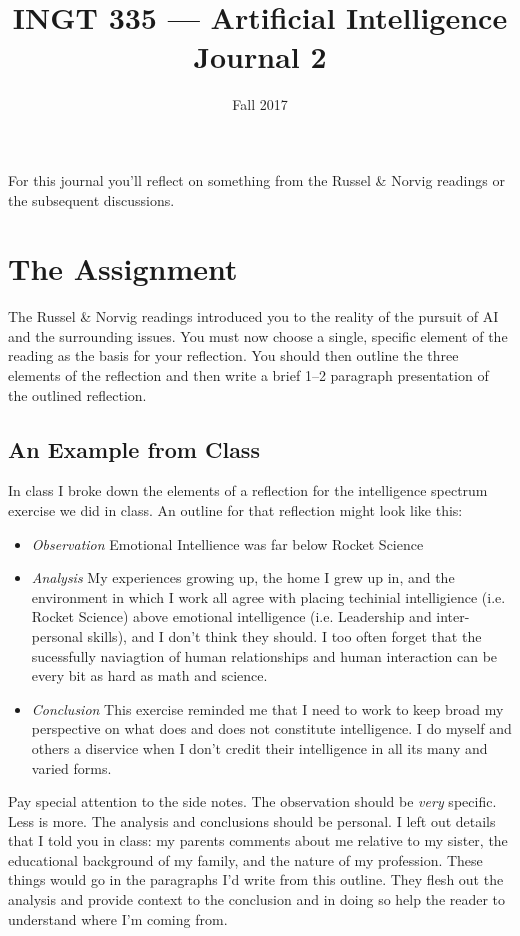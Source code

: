 \documentclass[nobib]{tufte-handout}
\title{INGT 335 --- Artificial Intelligence \\ Journal 2}
\author{}
\date{ Fall 2017 }
\begin{document}
\maketitle


For this journal you'll reflect on something from the Russel \& Norvig readings or the subsequent discussions.

\section{The Assignment}

The Russel \& Norvig readings introduced you to the reality of the pursuit of AI and the surrounding issues.  You must now choose a single, specific element of the reading as the basis for your reflection.  You should then outline the three elements of the reflection and then write a brief 1--2 paragraph presentation of the outlined reflection.

\subsection{An Example from Class}
In class I broke down the elements of a reflection for the intelligence spectrum exercise we did in class. An outline for that reflection might look like this:
  \begin{itemize}
    \item \textit{Observation} Emotional Intellience was far below Rocket Science
    \item \textit{Analysis} My experiences growing up, the home I grew up in, and the environment in which I work all agree with placing techinial intelligience (i.e. Rocket Science) above emotional intelligence (i.e. Leadership and inter-personal skills), and I don't think they should.  I too often forget that the sucessfully naviagtion of human relationships and human interaction can be every bit as hard as math and science.
    \item \textit{Conclusion} This exercise reminded me that I need to work to keep broad my perspective on what does and does not constitute intelligence. I do myself and others a diservice when I don't credit their intelligence in all its many and varied forms.
  \end{itemize}
Pay special attention to the side notes. The observation should be \textit{very} specific. Less is more. The analysis and conclusions should be personal. I left out details that I told you in class: my parents comments about me relative to my sister, the educational background of my family, and the nature of my profession. These things would go in the paragraphs I'd write from this outline. They flesh out the analysis and provide context to the conclusion and in doing so help the reader to understand where I'm coming from.
\end{document}
